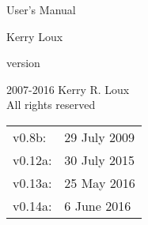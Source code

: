 \documentclass[oneside]{memoir}
\begin{document}
\frontmatter
{}%
\pagestyle{empty}

\vspace*{\fill}
\begin{center}
\HUGE\textsf{\VVASE{}}\par
\end{center}

\begin{center}
\Huge\textsf{User's Manual}\par
\end{center}

\begin{center}
\LARGE\textsf{Kerry Loux}\par
\medskip
\normalsize\textsf{version \version}\par
\end{center}
\vspace*{\fill}

\clearpage



\begingroup
\footnotesize
\setlength{\parindent}{0pt}
\setlength{\parskip}{\baselineskip}
\textcopyright{} 2007-2016 Kerry R. Loux \\
All rights reserved

\begin{center}
\begin{tabular}{ll}
v0.8b:   & 29 July 2009 \\
v0.12a:  & 30 July 2015 \\
v0.13a:  & 25 May 2016 \\
v0.14a:  & 6 June 2016 \\
\end{tabular}
\end{center}
\endgroup

\clearpage

\pagestyle{headings}

\tableofcontents
\setlength{\unitlength}{1pt}
\clearpage

\pagestyle{ruled}




\mainmatter






\end{document}
